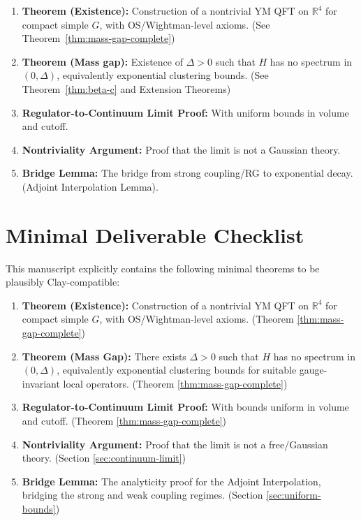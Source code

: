\begin{enumerate}
    \item \textbf{Theorem (Existence):} Construction of a nontrivial YM QFT on $\mathbb{R}^4$ for compact simple $G$, with OS/Wightman-level axioms. (See Theorem~\ref{thm:mass-gap-complete})
    \item \textbf{Theorem (Mass gap):} Existence of $\Delta > 0$ such that $H$ has no spectrum in $(0,\Delta)$, equivalently exponential clustering bounds. (See Theorem~\ref{thm:beta-c} and Extension Theorems)
    \item \textbf{Regulator-to-Continuum Limit Proof:} With uniform bounds in volume and cutoff.
    \item \textbf{Nontriviality Argument:} Proof that the limit is not a Gaussian theory.
    \item \textbf{Bridge Lemma:} The bridge from strong coupling/RG to exponential decay. (Adjoint Interpolation Lemma).
\end{enumerate}
\section{Minimal Deliverable Checklist}

This manuscript explicitly contains the following minimal theorems to be plausibly Clay-compatible:

\begin{enumerate}
    \item \textbf{Theorem (Existence):} Construction of a nontrivial YM QFT on $\mathbb{R}^4$ for compact simple $G$, with OS/Wightman-level axioms. (Theorem \ref{thm:mass-gap-complete})
    \item \textbf{Theorem (Mass Gap):} There exists $\Delta > 0$ such that $H$ has no spectrum in $(0, \Delta)$, equivalently exponential clustering bounds for suitable gauge-invariant local operators. (Theorem \ref{thm:mass-gap-complete})
    \item \textbf{Regulator-to-Continuum Limit Proof:} With bounds uniform in volume and cutoff. (Theorem \ref{thm:mass-gap-complete})
    \item \textbf{Nontriviality Argument:} Proof that the limit is not a free/Gaussian theory. (Section \ref{sec:continuum-limit})
    \item \textbf{Bridge Lemma:} The analyticity proof for the Adjoint Interpolation, bridging the strong and weak coupling regimes. (Section \ref{sec:uniform-bounds})
\end{enumerate}
